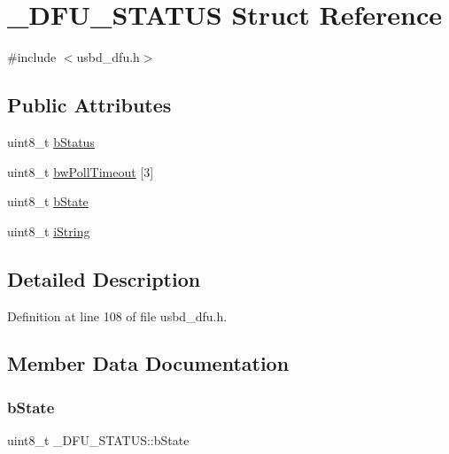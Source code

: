 \hypertarget{struct___d_f_u___s_t_a_t_u_s}{}\section{\+\_\+\+D\+F\+U\+\_\+\+S\+T\+A\+T\+US Struct Reference}
\label{struct___d_f_u___s_t_a_t_u_s}


{\ttfamily \#include $<$usbd\+\_\+dfu.\+h$>$}

\subsection*{Public Attributes}
\begin{DoxyCompactItemize}
\item 
uint8\+\_\+t \hyperlink{struct___d_f_u___s_t_a_t_u_s_a119f8cd204d5cac52dc10c5a05847c11}{b\+Status}
\item 
uint8\+\_\+t \hyperlink{struct___d_f_u___s_t_a_t_u_s_acb250abf9daba1a07c7ec98cb0e89bfe}{bw\+Poll\+Timeout} \mbox{[}3\mbox{]}
\item 
uint8\+\_\+t \hyperlink{struct___d_f_u___s_t_a_t_u_s_a0beec369f74d37d0e6329e3826e7b1ef}{b\+State}
\item 
uint8\+\_\+t \hyperlink{struct___d_f_u___s_t_a_t_u_s_ab486ff4ce617b2808ec80d0188403aab}{i\+String}
\end{DoxyCompactItemize}


\subsection{Detailed Description}


Definition at line 108 of file usbd\+\_\+dfu.\+h.



\subsection{Member Data Documentation}
\mbox{\label{struct___d_f_u___s_t_a_t_u_s_a0beec369f74d37d0e6329e3826e7b1ef}} 
\subsubsection{\texorpdfstring{b\+State}{bState}}
{\footnotesize\ttfamily uint8\+\_\+t \+\_\+\+D\+F\+U\+\_\+\+S\+T\+A\+T\+U\+S\+::b\+State}



